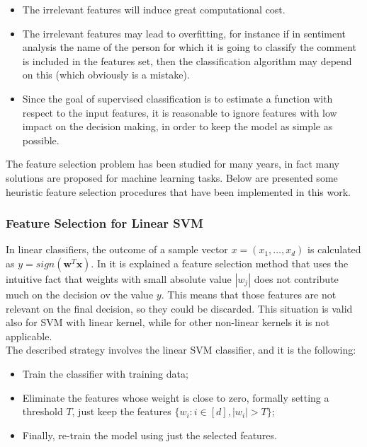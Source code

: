 \begin{itemize}
	\item The irrelevant features will induce great computational cost. 
	\item The irrelevant features may lead to overfitting, for instance if in sentiment analysis the name of the person for which it is going to classify the comment is included in the features set, then the classification algorithm may depend on this (which obviously is a mistake).
	\item Since the goal of supervised classification is to estimate a function with respect to the input features, it is reasonable to ignore features with low impact on the decision making, in order to keep the model as simple as possible.
\end{itemize}

The feature selection problem has been studied for many years, in fact many solutions are proposed for machine learning tasks. Below are presented some heuristic feature selection procedures that have been implemented in this work.


\subsubsection{Feature Selection for Linear SVM}

In linear classifiers, the outcome of a sample vector $x = (x_1, \dots, x_d)$ is calculated as $y=sign(\mathbf{w}^T\mathbf{x})$. In \cite{Brank2002FeatureSU} it is explained a feature selection method that uses the intuitive fact that weights with small absolute value $|w_j|$ does not contribute much on the decision ov the value $y$. This means that those features are not relevant on the final decision, so they could be discarded. This situation is valid also for SVM with linear kernel, while for other non-linear kernels it is not applicable.\\
The described strategy involves the linear SVM classifier, and it is the following:
\begin{itemize}
	\item Train the classifier with training data;
	\item Eliminate the features whose weight is close to zero, formally setting a threshold $T$, just keep the features $\{w_i : i \in [d], |w_i| > T\}$;
	\item Finally, re-train the model using just the selected features.
\end{itemize}

